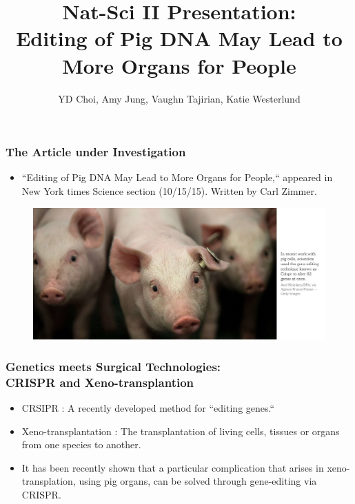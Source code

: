 \documentclass{beamer}
\title{Nat-Sci II Presentation: \\
Editing of Pig DNA May Lead to More Organs for People}
\author{YD Choi, Amy Jung, Vaughn Tajirian, Katie Westerlund }
\institute{New York University}
\begin{document}
 
\frame{\titlepage} 

\begin{frame}
\frametitle{The Article under Investigation}
\begin{itemize} 
\item ``Editing of Pig DNA May Lead to More Organs for People,`` appeared in
New York times Science section (10/15/15). Written by Carl Zimmer.
\end{itemize}
\begin{figure}[h!]
  \centering
    \includegraphics[width=1\textwidth]{edit-pigs.png}
\end{figure}
\end{frame}

\begin{frame}
\frametitle{Genetics meets Surgical Technologies: \\
CRISPR and Xeno-transplantion}
\begin{itemize}
\item CRSIPR : A recently developed method for 
``editing genes.``
\item Xeno-transplantation :
The transplantation of living cells, tissues or organs
from one species to another. 
\item It has been recently shown that a particular
complication that arises in
xeno-transplation, using pig organs,
can be solved through gene-editing via CRISPR. 
\end{itemize}
\end{frame}
\end{document}
